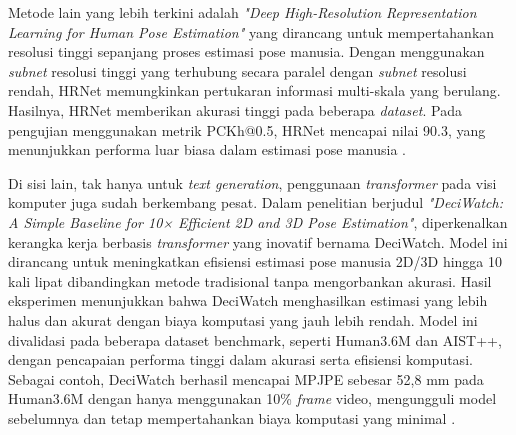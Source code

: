 Metode lain yang lebih terkini adalah \textit{"Deep High-Resolution Representation Learning for Human Pose Estimation"} yang dirancang untuk mempertahankan resolusi tinggi sepanjang proses estimasi pose manusia. Dengan menggunakan \textit{subnet} resolusi tinggi yang terhubung secara paralel dengan \textit{subnet} resolusi rendah, HRNet memungkinkan pertukaran informasi multi-skala yang berulang. Hasilnya, HRNet memberikan akurasi tinggi pada beberapa \textit{dataset}. Pada pengujian menggunakan metrik PCKh@0.5, HRNet mencapai nilai 90.3, yang menunjukkan performa luar biasa dalam estimasi pose manusia .

Di sisi lain, tak hanya untuk \textit{text generation}, penggunaan \textit{transformer} pada visi komputer juga sudah berkembang pesat. Dalam penelitian berjudul \textit{"DeciWatch: A Simple Baseline for 10× Efficient 2D and 3D Pose Estimation"}, diperkenalkan kerangka kerja berbasis \textit{transformer} yang inovatif bernama DeciWatch. Model ini dirancang untuk meningkatkan efisiensi estimasi pose manusia 2D/3D hingga 10 kali lipat dibandingkan metode tradisional tanpa mengorbankan akurasi. Hasil eksperimen menunjukkan bahwa DeciWatch menghasilkan estimasi yang lebih halus dan akurat dengan biaya komputasi yang jauh lebih rendah. Model ini divalidasi pada beberapa dataset benchmark, seperti Human3.6M dan AIST++, dengan pencapaian performa tinggi dalam akurasi serta efisiensi komputasi. Sebagai contoh, DeciWatch berhasil mencapai MPJPE sebesar 52,8 mm pada Human3.6M dengan hanya menggunakan 10\% \textit{frame} video, mengungguli model sebelumnya dan tetap mempertahankan biaya komputasi yang minimal \cite{zeng2022deciwatch}.

